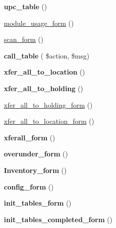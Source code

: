 \begin{DoxyCompactItemize}
{\bfseries upc\+\_\+table} ()
\item 
\hyperlink{class_inventory__ui_af471f1ac90fef82d9f75185c7c8377f2}{module\+\_\+usage\+\_\+form} ()
\item 
\hyperlink{class_inventory__ui_a208526e58fa535e58764a7364316b4ae}{scan\+\_\+form} ()
\item 
\hypertarget{class_inventory__ui_aaf654bb6c84957067ee398ab44e3cf22}{}\label{class_inventory__ui_aaf654bb6c84957067ee398ab44e3cf22} 
{\bfseries call\+\_\+table} ( \$action, \$msg)
\item 
\hypertarget{class_inventory__ui_a86eea7fe792774c8a15ae86e07e66e2e}{}\label{class_inventory__ui_a86eea7fe792774c8a15ae86e07e66e2e} 
{\bfseries xfer\+\_\+all\+\_\+to\+\_\+location} ()
\item 
\hypertarget{class_inventory__ui_ad950a22f482e9f1a778b6771234bce42}{}\label{class_inventory__ui_ad950a22f482e9f1a778b6771234bce42} 
{\bfseries xfer\+\_\+all\+\_\+to\+\_\+holding} ()
\item 
\hyperlink{class_inventory__ui_aa78746090dbe3bcdaf4478de2efa721b}{xfer\+\_\+all\+\_\+to\+\_\+holding\+\_\+form} ()
\item 
\hyperlink{class_inventory__ui_a90577c96830f5f59f301034f4e130b2f}{xfer\+\_\+all\+\_\+to\+\_\+location\+\_\+form} ()
\item 
\hypertarget{class_inventory__ui_ad1ce51a3c48c8abb4278e93160cd1c08}{}\label{class_inventory__ui_ad1ce51a3c48c8abb4278e93160cd1c08} 
{\bfseries xferall\+\_\+form} ()
\item 
\hypertarget{class_inventory__ui_a2b914b6cf2b424e15f026edbe0e0170a}{}\label{class_inventory__ui_a2b914b6cf2b424e15f026edbe0e0170a} 
{\bfseries overunder\+\_\+form} ()
\item 
\hypertarget{class_inventory__ui_a42f3094f748f65b77fe3be03452994ac}{}\label{class_inventory__ui_a42f3094f748f65b77fe3be03452994ac} 
{\bfseries Inventory\+\_\+form} ()
\item 
\hypertarget{class_inventory__ui_a791ffee677350961cb676a08372fb479}{}\label{class_inventory__ui_a791ffee677350961cb676a08372fb479} 
{\bfseries config\+\_\+form} ()
\item 
\hypertarget{class_inventory__ui_ae2a5be945a5320013f6d973f5c9338f0}{}\label{class_inventory__ui_ae2a5be945a5320013f6d973f5c9338f0} 
{\bfseries init\+\_\+tables\+\_\+form} ()
\item 
\hypertarget{class_inventory__ui_ab88e4bea473aad102c4850f5447d0579}{}\label{class_inventory__ui_ab88e4bea473aad102c4850f5447d0579} 
{\bfseries init\+\_\+tables\+\_\+completed\+\_\+form} ()

\end{DoxyCompactItemize}
